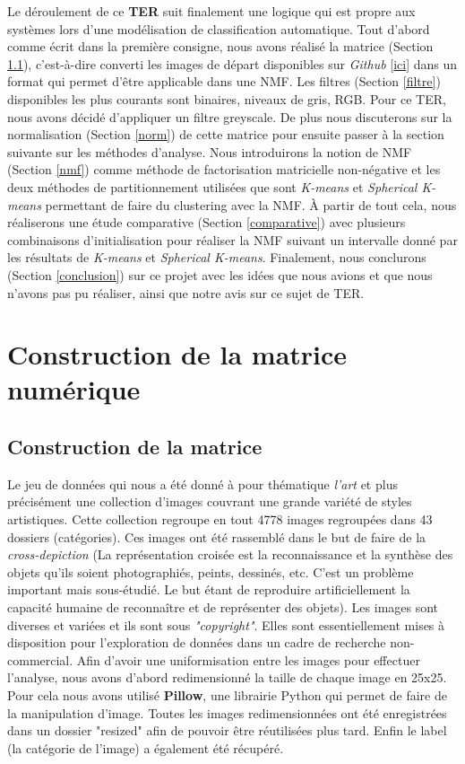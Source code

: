 \documentclass[runningheads]{llncs}
\begin{document}
Le déroulement de ce \textbf{TER} suit finalement une logique qui est propre aux systèmes lors d'une modélisation de classification automatique.
Tout d'abord comme écrit dans la première consigne, nous avons réalisé la matrice (Section \ref{constmat}), c'est-à-dire converti les images de départ disponibles sur \textit{Github} [\href{https://github.com/BathVisArtData/PeopleArt/tree/master/JPEGImages}{ici}] dans un format qui permet d'être applicable dans une NMF. Les filtres (Section \ref{filtre}) disponibles les plus courants sont binaires, niveaux de gris, RGB. Pour ce TER, nous avons décidé d'appliquer un filtre greyscale.
De plus nous discuterons sur la normalisation (Section \ref{norm}) de cette matrice pour ensuite passer à la section suivante sur les méthodes d'analyse.
Nous introduirons la notion de NMF (Section \ref{nmf}) comme méthode de factorisation matricielle non-négative et les deux méthodes de partitionnement utilisées que sont \textit{K-means} et \textit{Spherical K-means} permettant de faire du clustering avec la NMF.
\`A partir de tout cela, nous réaliserons une étude comparative (Section \ref{comparative}) avec plusieurs combinaisons d'initialisation pour réaliser la NMF suivant un intervalle donné par les résultats de \textit{K-means} et \textit{Spherical K-means}.
Finalement, nous conclurons (Section \ref{conclusion}) sur ce projet avec les idées que nous avions et que nous n'avons pas pu réaliser, ainsi que notre avis sur ce sujet de TER.

\section{Construction de la matrice num\'erique}

\subsection{Construction de la matrice}
\label{constmat}

Le jeu de données qui nous a été donné à pour thématique \textit{l'art} et plus précisément une collection d'images couvrant une grande variété de styles artistiques. Cette collection \cite{westlake2016detecting} regroupe en tout 4778 images regroupées dans 43 dossiers (catégories).
Ces images ont été rassemblé dans le but de faire de la \textit{cross-depiction} (La représentation croisée est la reconnaissance et la synthèse des objets qu'ils soient photographiés, peints, dessinés, etc. C'est un problème important mais sous-étudié. Le but étant de reproduire artificiellement la capacité humaine de reconnaître et de représenter des objets).
Les images sont diverses et variées et ils sont sous \textit{"copyright"}. Elles sont essentiellement mises à disposition pour l'exploration de données dans un cadre de recherche non-commercial.
Afin d'avoir une uniformisation entre les images pour effectuer l'analyse, nous avons d'abord redimensionné la taille de chaque image en 25x25.
Pour cela nous avons utilisé \textbf{Pillow}, une librairie Python \cite{python} qui permet de faire de la manipulation d'image. Toutes les images redimensionnées ont été enregistrées dans un dossier "resized" afin de pouvoir être réutilisées plus tard. Enfin le label (la catégorie de l'image) a également été récupéré.
\end{document}
